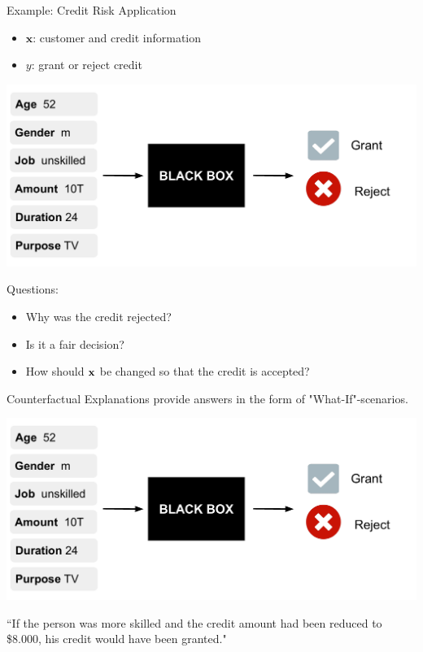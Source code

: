 \documentclass[11pt,compress,t,notes=noshow, xcolor=table]{beamer}
\begin{document}
\begin{vbframe}{Example: Credit Risk Application} 
	\begin{itemize}
		\item $\textbf{x}$: customer and credit information
		\item $y$: grant or reject credit
	\end{itemize}
	\begin{center}\includegraphics[width=0.65\linewidth, page=1]{figure/counterfactuals_credit.pdf} \end{center}
	
	Questions: 
	\begin{itemize}
		\item Why was the credit rejected? 
		\item Is it a fair decision? 
		\item How should $\xv$ be changed so that the credit is accepted?  
	\end{itemize}
	
	\framebreak
	Counterfactual Explanations provide answers in the form of "What-If"-scenarios. 
	\begin{center}\includegraphics[width=0.65\linewidth, page=2]{figure/counterfactuals_credit.pdf} \end{center}
	
	``If the person was more skilled and the credit amount had been reduced to \$8.000, his credit would have been granted."  \\[0.2cm]
	
	

\end{vbframe}
\end{document}
